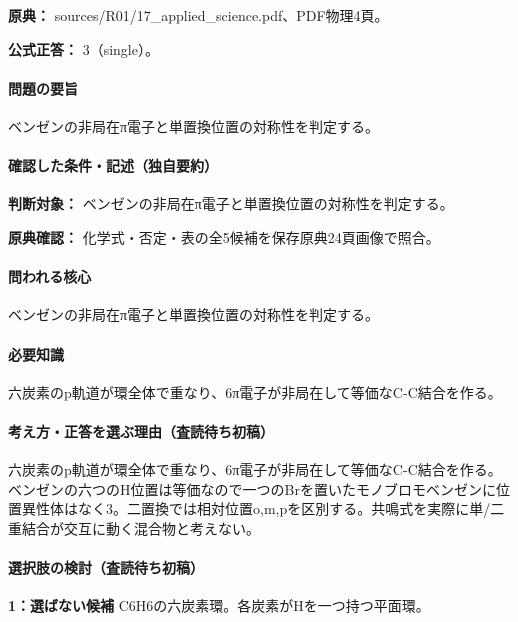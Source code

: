 \noindent\textbf{原典：} sources/R01/17\_applied\_science.pdf、PDF物理4頁。

\textbf{公式正答：} 3（single）。

\paragraph{問題の要旨} ベンゼンの非局在π電子と単置換位置の対称性を判定する。

\paragraph{確認した条件・記述（独自要約）}\mbox{}\par

\noindent\textbf{判断対象：} ベンゼンの非局在π電子と単置換位置の対称性を判定する。\par

\noindent\textbf{原典確認：} 化学式・否定・表の全5候補を保存原典24頁画像で照合。\par

\paragraph{問われる核心} ベンゼンの非局在π電子と単置換位置の対称性を判定する。

\paragraph{必要知識} 六炭素のp軌道が環全体で重なり、6π電子が非局在して等価なC-C結合を作る。

\paragraph{考え方・正答を選ぶ理由（査読待ち初稿）} 六炭素のp軌道が環全体で重なり、6π電子が非局在して等価なC-C結合を作る。ベンゼンの六つのH位置は等価なので一つのBrを置いたモノブロモベンゼンに位置異性体はなく3。二置換では相対位置o,m,pを区別する。共鳴式を実際に単/二重結合が交互に動く混合物と考えない。

\paragraph{選択肢の検討（査読待ち初稿）}\mbox{}\par

\noindent\textbf{1：選ばない候補} C6H6の六炭素環。各炭素がHを一つ持つ平面環。\par

